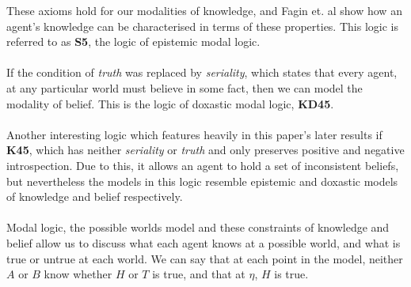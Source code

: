 These axioms hold for our modalities of knowledge, and Fagin et. al \cite{fagin1995reasoning} show
how an agent's knowledge can be characterised in terms of these properties.
This logic is referred to as {\bf S5}, the logic of epistemic modal logic.\\
\\
If the condition of {\em truth} was replaced by {\em seriality}, which states that every agent, at
any particular world must believe in some fact, then we can model the modality of belief.
This is the logic of doxastic modal logic, {\bf KD45}.\\
\\
Another interesting logic which features heavily in this paper's later results if {\bf K45}, which
has neither {\em seriality} or {\em truth} and only preserves positive and negative introspection.
Due to this, it allows an agent to hold a set of inconsistent beliefs, but nevertheless the models
in this logic resemble epistemic and doxastic models of knowledge and belief respectively.\\
\\
Modal logic, the possible worlds model and these constraints of knowledge and belief allow us to
discuss what each agent knows at a possible world, and what is true or untrue at each world.
We can say that at each point in the model, neither $A$ or $B$ know whether $H$ or $T$ is true, and
that at $\eta$, $H$ is true.\\
\\
%
%
%
%
%
